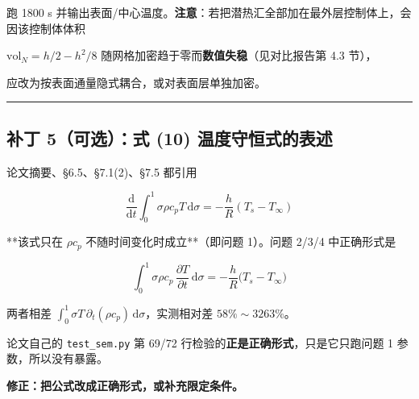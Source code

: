 跑 1800 s 并输出表面/中心温度。\textbf{注意}：若把潜热汇全部加在最外层控制体上，会因该控制体体积

$\mathrm{vol}_N=h/2-h^2/8$ 随网格加密趋于零而\textbf{数值失稳}（见对比报告第 4.3 节），

应改为按表面通量隐式耦合，或对表面层单独加密。


\vspace{1mm}\hrule\vspace{1mm}


\subsection{补丁 5（可选）：式 (10) 温度守恒式的表述}


论文摘要、§6.5、§7.1(2)、§7.5 都引用


\begin{equation*}
\frac{\mathrm d}{\mathrm dt}\int_0^1\!\sigma\rho c_pT\,\mathrm d\sigma=-\frac hR(T_s-T_\infty)
\end{equation*}


**该式只在 $\rho c_p$ 不随时间变化时成立**（即问题 1）。问题 2/3/4 中正确形式是


\begin{equation*}
\int_0^1\!\sigma\rho c_p\,\frac{\partial T}{\partial t}\,\mathrm d\sigma=-\frac hR\big(T_s-T_\infty\big)
\end{equation*}


两者相差 $\int_0^1\!\sigma T\,\partial_t(\rho c_p)\,\mathrm d\sigma$，实测相对差 $58\%\sim3263\%$。

论文自己的 \texttt{test\_sem.py} 第 69/72 行检验的\textbf{正是正确形式}，只是它只跑问题 1 参数，所以没有暴露。


\textbf{修正：把公式改成正确形式，或补充限定条件。}

